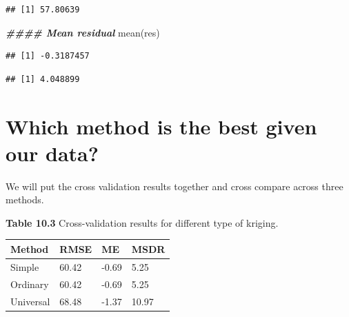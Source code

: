 \documentclass[
]{book}
\newenvironment{Shaded}{\begin{snugshade}}{\end{snugshade}}
\newcommand{\DecValTok}[1]{\textcolor[rgb]{0.00,0.00,0.81}{#1}}
\newcommand{\DocumentationTok}[1]{\textcolor[rgb]{0.56,0.35,0.01}{\textbf{\textit{#1}}}}
\newcommand{\FunctionTok}[1]{\textcolor[rgb]{0.00,0.00,0.00}{#1}}
\newcommand{\NormalTok}[1]{#1}
\newcommand{\SpecialCharTok}[1]{\textcolor[rgb]{0.00,0.00,0.00}{#1}}
\begin{document}
\begin{verbatim}
## [1] 57.80639
\end{verbatim}

\begin{Shaded}
\begin{Highlighting}[]
\DocumentationTok{\#\#\#\# Mean residual}
\FunctionTok{mean}\NormalTok{(res)}
\end{Highlighting}
\end{Shaded}

\begin{verbatim}
## [1] -0.3187457
\end{verbatim}

\begin{Shaded}
\end{Shaded}

\begin{verbatim}
## [1] 4.048899
\end{verbatim}

\hypertarget{which-method-is-the-best-given-our-data}{%
\section*{Which method is the best given our data?}\label{which-method-is-the-best-given-our-data}}

We will put the cross validation results together and cross compare across three methods.

\textbf{Table 10.3} Cross-validation results for different type of kriging.

\begin{tabular}{l|l|l|l}
\hline
Method & RMSE & ME & MSDR\\
\hline
Simple & 60.42 & -0.69 & 5.25\\
\hline
Ordinary & 60.42 & -0.69 & 5.25\\
\hline
Universal & 68.48 & -1.37 & 10.97\\
\hline
\end{tabular}
\end{document}
